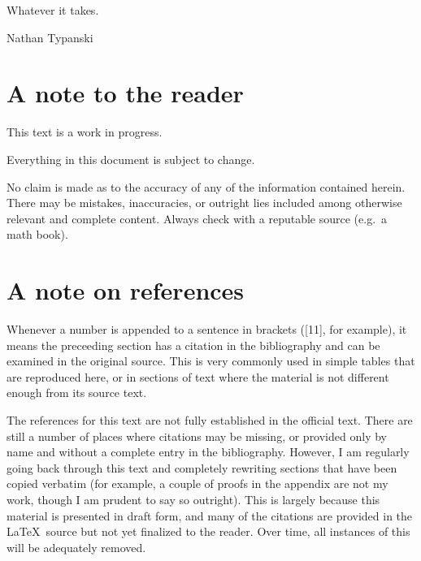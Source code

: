 Whatever it takes.

\hfill{Nathan Typanski}

\hfill \date{April 9, 2012}
\newpage
\section*{A note to the reader}
This text is a work in progress.

Everything in this document is subject to change.

No claim is made as to the accuracy of any of the information contained herein.
There may be mistakes, inaccuracies, or outright lies included among otherwise relevant and complete content.
Always check with a reputable source (e.g.\ a math book).

\newpage
\section*{A note on references}
Whenever a number is appended to a sentence in brackets ([11], for example), it means the preceeding section has a citation in the bibliography and can be examined in the original source.
This is very commonly used in simple tables that are reproduced here, or in sections of text where the material is not different enough from its source text.

The references for this text are not fully established in the official text.
There are still a number of places where citations may be missing, or provided only by name and without a complete entry in the bibliography.
However, I am regularly going back through this text and completely rewriting sections that have been copied verbatim (for example, a couple of proofs in the appendix are not my work, though I am prudent to say so outright).
This is largely because this material is presented in draft form, and many of the citations are provided in the \LaTeX\ source but not yet finalized to the reader.
Over time, all instances of this will be adequately removed.

